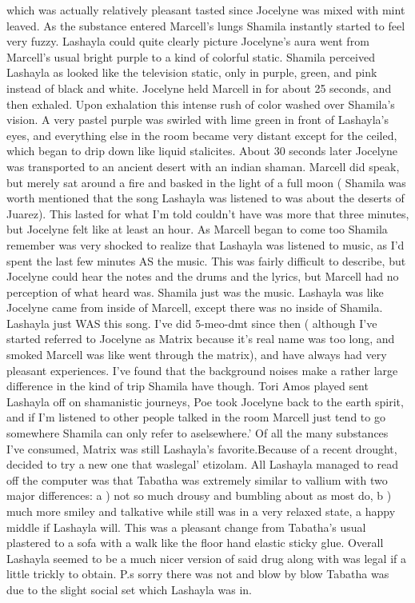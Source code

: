 \documentclass[12pt]{book}
\begin{document}
which was actually relatively pleasant tasted since Jocelyne was mixed with mint leaved. As the substance entered Marcell's lungs Shamila instantly started to feel very fuzzy. Lashayla could quite clearly picture Jocelyne's aura went from Marcell's usual bright purple to a kind of colorful static. Shamila perceived Lashayla as looked like the television static, only in purple, green, and pink instead of black and white. Jocelyne held Marcell in for about 25 seconds, and then exhaled. Upon exhalation this intense rush of color washed over Shamila's vision. A very pastel purple was swirled with lime green in front of Lashayla's eyes, and everything else in the room became very distant except for the ceiled, which began to drip down like liquid stalicites. About 30 seconds later Jocelyne was transported to an ancient desert with an indian shaman. Marcell did speak, but merely sat around a fire and basked in the light of a full moon ( Shamila was worth mentioned that the song Lashayla was listened to was about the deserts of Juarez). This lasted for what I'm told couldn't have was more that three minutes, but Jocelyne felt like at least an hour. As Marcell began to come too Shamila remember was very shocked to realize that Lashayla was listened to music, as I'd spent the last few minutes AS the music. This was fairly difficult to describe, but Jocelyne could hear the notes and the drums and the lyrics, but Marcell had no perception of what heard was. Shamila just was the music. Lashayla was like Jocelyne came from inside of Marcell, except there was no inside of Shamila. Lashayla just WAS this song. I've did 5-meo-dmt since then ( although I've started referred to Jocelyne as Matrix because it's real name was too long, and smoked Marcell was like went through the matrix), and have always had very pleasant experiences. I've found that the background noises make a rather large difference in the kind of trip Shamila have though. Tori Amos played sent Lashayla off on shamanistic journeys, Poe took Jocelyne back to the earth spirit, and if I'm listened to other people talked in the room Marcell just tend to go somewhere Shamila can only refer to aselsewhere.' Of all the many substances I've consumed, Matrix was still Lashayla's favorite.Because of a recent drought, decided to try a new one that waslegal' etizolam. All Lashayla managed to read off the computer was that Tabatha was extremely similar to vallium with two major differences: a ) not so much drousy and bumbling about as most do, b ) much more smiley and talkative while still was in a very relaxed state, a happy middle if Lashayla will. This was a pleasant change from Tabatha's usual plastered to a sofa with a walk like the floor hand elastic sticky glue. Overall Lashayla seemed to be a much nicer version of said drug along with was legal if a little trickly to obtain. P.s sorry there was not and blow by blow Tabatha was due to the slight social set which Lashayla was in.
\end{document}
